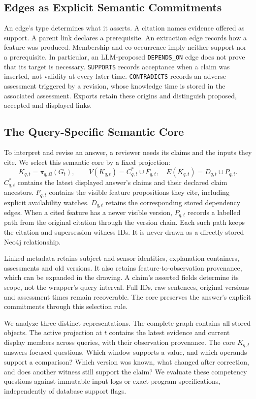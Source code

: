 

\subsection{Edges as Explicit Semantic Commitments}

An edge's type determines what it asserts. A citation names evidence offered as support. A parent link declares a prerequisite. An extraction edge records how
a feature was produced. Membership and co-occurrence imply neither support nor
a prerequisite. In particular, an LLM-proposed \texttt{DEPENDS\_ON} edge does not
prove that its target is necessary. \texttt{SUPPORTS} records acceptance when a
claim was inserted, not validity at every later time. \texttt{CONTRADICTS}
records an adverse assessment triggered by a revision, whose knowledge time is
stored in the associated assessment. Exports retain these origins and distinguish
proposed, accepted and displayed links.

\subsection{The Query-Specific Semantic Core}

To interpret and revise an answer, a reviewer needs its claims and the inputs
they cite. We select this semantic core by a fixed projection:
\begin{equation}
 K_{q,t}=\pi_{q,\Omega}(G_t),\qquad
 V(K_{q,t})=C_{q,t}^{*}\cup F_{q,t},\quad
 E(K_{q,t})=D_{q,t}\cup P_{q,t}.
\label{eq:core}
\end{equation}
$C_{q,t}^{*}$ contains the latest displayed answer's claims and their declared
claim ancestors. $F_{q,t}$ contains the visible feature propositions they cite,
including explicit availability watches. $D_{q,t}$ retains the corresponding
stored dependency edges. When a cited feature has a newer visible version,
$P_{q,t}$ records a labelled path from the original citation through the version
chain. Each such path keeps the citation and supersession witness IDs.
It is never drawn as a directly stored Neo4j relationship.

Linked metadata retains subject and sensor identities, explanation containers,
assessments and old versions. It also retains feature-to-observation provenance,
which can be expanded in the drawing. A claim's asserted fields determine its scope, not the wrapper's query interval. Full IDs,
raw sentences, original versions and assessment times remain recoverable.
The core preserves the answer's explicit commitments through this selection rule.

We analyze three distinct representations. The complete graph contains all stored
objects. The active projection at $t$ contains the latest evidence and current
display members across queries, with their observation provenance.
The core $K_{q,t}$ answers focused questions. Which window supports
a value, and which operands support a comparison? Which version was known,
what changed after correction, and does another witness still support the claim?
We evaluate these competency questions against immutable input logs or exact
program specifications, independently of database support flags.


